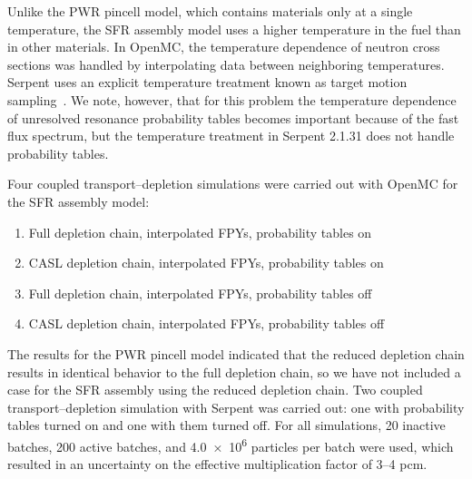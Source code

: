 \documentclass[3p,authoryear]{elsarticle}
\begin{document}
Unlike the PWR pincell model, which contains materials only at a single
temperature, the SFR assembly model uses a higher temperature in the fuel than
in other materials. In OpenMC, the temperature dependence of neutron cross
sections was handled by interpolating data between neighboring temperatures.
Serpent uses an explicit temperature treatment known as target motion
sampling~\citep{viitanen2012nse}. We note, however, that for this problem the
temperature dependence of unresolved resonance probability tables becomes
important because of the fast flux spectrum, but the temperature treatment in
Serpent 2.1.31 does not handle probability tables.

Four coupled transport--depletion simulations were carried out with OpenMC for
the SFR assembly model:
\begin{enumerate}
  \item Full depletion chain, interpolated FPYs, probability tables on
  \item CASL depletion chain, interpolated FPYs, probability tables on
  \item Full depletion chain, interpolated FPYs, probability tables off
  \item CASL depletion chain, interpolated FPYs, probability tables off
\end{enumerate}
The results for the PWR pincell model indicated that the reduced depletion chain
results in identical behavior to the full depletion chain, so we have not
included a case for the SFR assembly using the reduced depletion chain. Two
coupled transport--depletion simulation with Serpent was carried out: one with
probability tables turned on and one with them turned off. For all simulations,
20 inactive batches, 200 active batches, and \num{4.0e6} particles per batch
were used, which resulted in an uncertainty on the effective multiplication
factor of 3--4 pcm.
\end{document}
